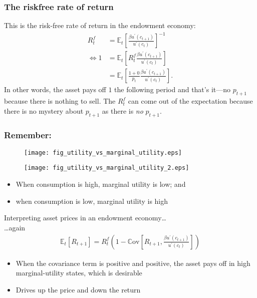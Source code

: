 \documentclass[presentation,dvipsnames]{beamer}
\begin{document}
\begin{frame}
\frametitle{The riskfree rate of return}
This is the risk-free rate of return in the endowment economy:
\begin{align*}
R^{f}_{t} &= \mathbb{E}_{t} \left[ \frac{\beta u^{\prime}(c_{t+1})}{u^{\prime}(c_{t})} \right]^{-1} \\
\iff 1 &= \mathbb{E}_{t} \left[ R^{f}_{t} \frac{\beta u^{\prime}(c_{t+1})}{u^{\prime}(c_{t})} \right] \\
&= \mathbb{E}_{t} \left[ \frac{1 + 0}{p_{t}} \frac{\beta u^{\prime}(c_{t+1})}{u^{\prime}(c_{t})} \right].
\end{align*}
In other words, the asset pays off $1$ the following period and that's it---no $p_{t+1}$ because there is nothing to sell.
The $R^{f}_{t}$ can come out of the expectation because there is no mystery about $p_{t+1}$ as there is \emph{no} $p_{t+1}$.
\end{frame}


\begin{frame}
\frametitle{Remember:}
\begin{figure}
\centering
\begin{minipage}{.5\textwidth}
  \centering
  \texttt{[image: fig\_utility\_vs\_marginal\_utility.eps]}
\end{minipage}%
\begin{minipage}{.5\textwidth}
  \centering
  \texttt{[image: fig\_utility\_vs\_marginal\_utility\_2.eps]}
\end{minipage}
\end{figure}
\begin{itemize}[label={--}]
\item When consumption is high, marginal utility is low; and
\item when consumption is low, marginal utility is high
\end{itemize}
\end{frame}

\begin{frame}[label=sec-4-6]{Interpreting asset prices in an endowment economy\dots{} \\ \dots{}again}
\begin{align*}
\mathbb{E}_{t} \left[ R_{t+1} \right] = R^{f}_{t} \left( 1 - \mathbb{C} \text{ov} \left[ R_{t+1}, \frac{\beta u^{\prime}(c_{t+1})}{u^{\prime}(c_{t})} \right] \right)
\end{align*}

\begin{itemize}[label={--}]
\item When the covariance term is positive and positive, the asset pays off in high marginal-utility states, which is desirable
\item Drives up the price and down the return
\end{itemize}
\end{frame}
\end{document}
